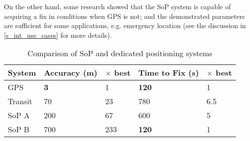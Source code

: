 On the other hand, some research showed that the SoP system is capable of acquiring a fix in conditions when GPS is not; and the demonstrated parameters are sufficient for some applications, e.g. emergency location (see the discussion in \autoref{s_int_use_cases} for more details).


\begin{table}
    \centering
    \begin{tabular}{l|ll|ll}
        System  & Accuracy (m) & $\times$ best & Time to Fix (s) &  $\times$ best \\ \hline
        GPS     & \textbf{3}   &             1 &    \textbf{120} & 1   \\
        Transit & 70           &            23 &             780 & 6.5 \\
        SoP A   & 200          &            67 &             600 & 5   \\
        SoP B   & 700          &           233 &    \textbf{120} & 1   \\
    \end{tabular}
    \caption{Comparison of SoP and dedicated positioning systems}
    \label{t_sop_comparison}
\end{table}

